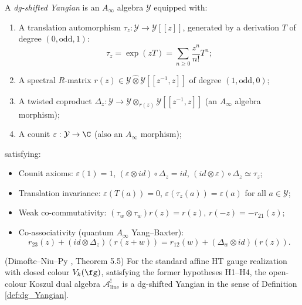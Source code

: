 \begin{definition}
A \emph{dg-shifted Yangian} is an $A_\infty$ algebra $\mathcal{Y}$ equipped with:
\begin{enumerate}[label=(\roman*)]
\item A translation automorphism $\tau_z : \mathcal{Y} \to \mathcal{Y}[[z]]$, generated by a derivation $T$ of degree $(0, \text{odd}, 1)$:
\begin{equation}
\tau_z = \exp(z T) = \sum_{n \geq 0} \frac{z^n}{n!} T^n;
\end{equation}

\item A spectral $R$-matrix $r(z) \in \mathcal{Y} \widehat{\otimes} \mathcal{Y}[[z^{-1}, z]]$ of degree $(1, \text{odd}, 0)$;

\item A twisted coproduct $\Delta_z : \mathcal{Y} \to \mathcal{Y} \otimes_{r(z)} \mathcal{Y}[[z^{-1}, z]]$ (an $A_\infty$ algebra morphism);
\item A counit $\varepsilon : \mathcal{Y} \to \C$ (also an $A_\infty$ morphism);
\end{enumerate}
satisfying:
\begin{itemize}
\item Counit axioms: $\varepsilon(1) = 1$, $(\varepsilon \otimes id) \circ \Delta_z = id$, $(id \otimes \varepsilon) \circ \Delta_z \simeq \tau_z$;
\item Translation invariance: $\varepsilon(T(a)) = 0$, $\varepsilon(\tau_z(a)) = \varepsilon(a)$ for all $a \in \mathcal{Y}$;
\item Weak co-commutativity: $(\tau_w \otimes \tau_w) r(z) = r(z)$, $r(-z) = -r_{21}(z)$;
\item Co-associativity (quantum $A_\infty$ Yang--Baxter):
\begin{equation}
r_{23}(z) + (id \otimes \Delta_z)(r(z+w)) = r_{12}(w) + (\Delta_w \otimes id)(r(z)).
\end{equation}
\end{itemize}
\end{definition}
\begin{theorem}
(Dimofte--Niu--Py \cite{DNP25}, Theorem 5.5) For the standard affine HT gauge realization with closed colour $V_k(\fg)$, satisfying the former hypotheses H1--H4, the open-colour Koszul dual algebra $\mathcal{A}^!_{\mathrm{line}}$ is a dg-shifted Yangian in the sense of Definition \ref{def:dg_Yangian}.
\end{theorem}

